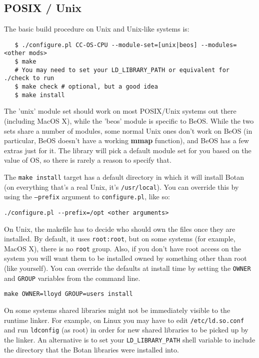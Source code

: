 \documentclass{article}
\newcommand{\filename}[1]{\texttt{#1}}
\newcommand{\function}[1]{\textbf{#1}}
\begin{document}
\pagebreak

\subsection{POSIX / Unix}

The basic build procedure on Unix and Unix-like systems is:

\begin{verbatim}
   $ ./configure.pl CC-OS-CPU --module-set=[unix|beos] --modules=<other mods>
   $ make
   # You may need to set your LD_LIBRARY_PATH or equivalent for ./check to run
   $ make check # optional, but a good idea
   $ make install
\end{verbatim}

The 'unix' module set should work on most POSIX/Unix systems out there
(including MacOS X), while the 'beos' module is specific to BeOS. While the two
sets share a number of modules, some normal Unix ones don't work on BeOS (in
particular, BeOS doesn't have a working \function{mmap} function), and BeOS has
a few extras just for it. The library will pick a default module set for you
based on the value of OS, so there is rarely a reason to specify that.

The \verb|make install| target has a default directory in which it will install
Botan (on everything that's a real Unix, it's \verb|/usr/local|). You can
override this by using the \texttt{--prefix} argument to
\filename{configure.pl}, like so:

\verb|./configure.pl --prefix=/opt <other arguments>|

On Unix, the makefile has to decide who should own the files once they are
installed. By default, it uses \texttt{root:root}, but on some systems (for
example, MacOS X), there is no \texttt{root} group. Also, if you don't have
root access on the system you will want them to be installed owned by something
other than root (like yourself). You can override the defaults at install time
by setting the \texttt{OWNER} and \texttt{GROUP} variables from the command
line.

\verb|make OWNER=lloyd GROUP=users install|

On some systems shared libraries might not be immediately visible to the
runtime linker. For example, on Linux you may have to edit
\filename{/etc/ld.so.conf} and run \texttt{ldconfig} (as root) in order for new
shared libraries to be picked up by the linker. An alternative is to set your
\texttt{LD\_LIBRARY\_PATH} shell variable to include the directory that the
Botan libraries were installed into.
\end{document}
